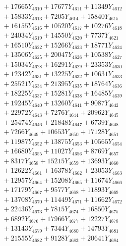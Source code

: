 \documentclass[a4paper,10pt]{article}
\begin{document}
{\begin{align}
&\;  + 17665 Y_{4610} + 17677 Y_{4611} + 11349 Y_{4612} \\[0.3ex]
&\;  + 15833 Y_{4613} + 7205 Y_{4614} + 15840 Y_{4615} \\[0.3ex]
&\;  + 16155 Y_{4616} + 10520 Y_{4617} + 10276 Y_{4618} \\[0.5ex]\allowbreak
&\;  + 24034 Y_{4619} + 14550 Y_{4620} + 7737 Y_{4621} \\[0.3ex]
&\;  + 16510 Y_{4622} + 15266 Y_{4623} + 18771 Y_{4624} \\[0.3ex]
&\;  + 13506 Y_{4625} + 20047 Y_{4626} + 10538 Y_{4627} \\[0.3ex]
&\;  + 15034 Y_{4628} + 16291 Y_{4629} + 23353 Y_{4630} \\[0.3ex]
&\;  + 12342 Y_{4631} + 13225 Y_{4632} + 10631 Y_{4633} \\[0.3ex]
&\;  + 25521 Y_{4634} + 21395 Y_{4635} + 18764 Y_{4636} \\[0.3ex]
&\;  + 18225 Y_{4637} + 15281 Y_{4638} + 16485 Y_{4639} \\[0.3ex]
&\;  + 19245 Y_{4640} + 13260 Y_{4641} + 9087 Y_{4642} \\[0.3ex]
&\;  + 22972 Y_{4643} + 7276 Y_{4644} + 20962 Y_{4645} \\[0.3ex]
&\;  + 25474 Y_{4646} + 21848 Y_{4647} + 6739 Y_{4648} \\[0.5ex]\allowbreak
&\;  + 7266 Y_{4649} + 10653 Y_{4650} + 17128 Y_{4651} \\[0.3ex]
&\;  + 11987 Y_{4652} + 13875 Y_{4653} + 10565 Y_{4654} \\[0.3ex]
&\;  + 16680 Y_{4655} + 11027 Y_{4656} + 8769 Y_{4657} \\[0.3ex]
&\;  + 8317 Y_{4658} + 15215 Y_{4659} + 13693 Y_{4660} \\[0.3ex]
&\;  + 12622 Y_{4661} + 16378 Y_{4662} + 23053 Y_{4663} \\[0.3ex]
&\;  + 12957 Y_{4664} + 15208 Y_{4665} + 11674 Y_{4666} \\[0.3ex]
&\;  + 17179 Y_{4667} + 9577 Y_{4668} + 11893 Y_{4669} \\[0.3ex]
&\;  + 13708 Y_{4670} + 11449 Y_{4671} + 11662 Y_{4672} \\[0.3ex]
&\;  + 22436 Y_{4673} + 7815 Y_{4674} + 16850 Y_{4675} \\[0.3ex]
&\;  + 6892 Y_{4676} + 17966 Y_{4677} + 12227 Y_{4678} \\[0.5ex]\allowbreak
&\;  + 13143 Y_{4679} + 7344 Y_{4680} + 14793 Y_{4681} \\[0.3ex]
&\;  + 21555 Y_{4682} + 9128 Y_{4683} + 20641 Y_{4684} \\[0.3ex]

\end{align}}
\end{document}
